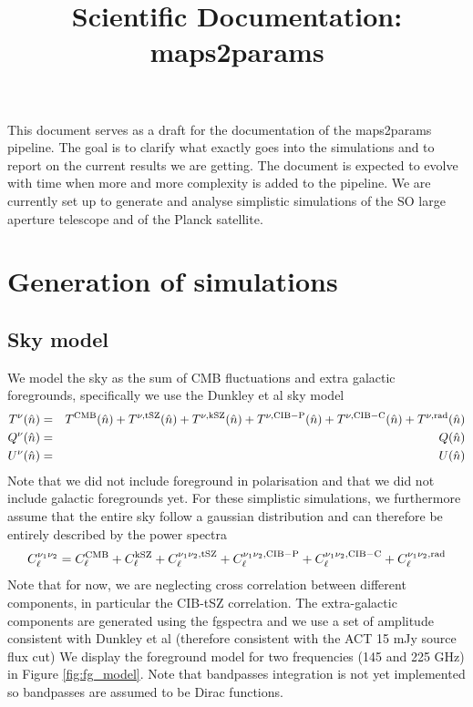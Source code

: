 \documentclass[a4paper, 11pt]{article}
\def\ba{\begin{eqnarray}}
\def\ea{\end{eqnarray}}
\begin{document}
\title{\textbf{Scientific Documentation: maps2params}}
\maketitle

This document serves as a draft for the documentation of the maps2params pipeline. The goal is to clarify what exactly goes into the simulations and to report on the current results we are getting. The document is expected to evolve with time when more and more complexity is added to the pipeline.
We are currently set up to generate and analyse simplistic simulations of the SO large aperture telescope and of the Planck satellite.

\section{Generation of simulations}

\subsection{Sky model}

We model the sky as the sum of CMB fluctuations and extra galactic foregrounds, specifically we use the Dunkley et al sky model
\ba
T^{\nu}(\hat{n}) &=&  T^{\rm CMB}(\hat{n}) + T^{\nu, \rm tSZ}(\hat{n}) + T^{\nu, \rm kSZ}(\hat{n}) + T^{\nu, \rm CIB-P}(\hat{n}) + T^{\nu, \rm CIB-C}(\hat{n}) + T^{\nu, \rm rad}(\hat{n}) \nonumber \\
Q^{\nu}(\hat{n}) &=& Q(\hat{n}) \nonumber \\
U^{\nu}(\hat{n}) &=& U(\hat{n})
\ea
Note that we did not include foreground in polarisation and that we did not include galactic foregrounds yet. For these simplistic simulations, we furthermore assume that the entire sky follow a gaussian distribution and can therefore be entirely described by the power spectra
\ba
C^{\nu_{1} \nu_{2}}_{\ell} = C^{\rm CMB}_{\ell} + C^{ \rm kSZ}_{\ell}   + C^{\nu_{1} \nu_{2}, \rm tSZ}_{\ell}  + C^{\nu_{1} \nu_{2}, \rm CIB-P}_{\ell} + C^{\nu_{1} \nu_{2}, \rm CIB-C}_{\ell} + C^{\nu_{1} \nu_{2}, \rm rad}_{\ell}
\ea
Note that for now, we are neglecting cross correlation between different components, in particular the CIB-tSZ correlation. The extra-galactic components are generated using the fgspectra and we use a set of amplitude consistent with Dunkley et al (therefore consistent with the ACT 15 mJy source flux cut)
We display the foreground model for two frequencies (145 and 225 GHz) in Figure \ref{fig:fg_model}. Note that bandpasses integration is not yet implemented so bandpasses are assumed to be Dirac functions. 
\end{document}
